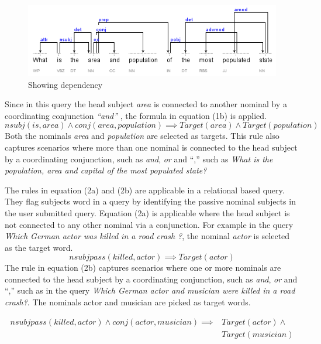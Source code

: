 \documentclass[review]{elsarticle}
\begin{document}
\begin{figure}[h]
	\centering
		\includegraphics[scale=0.7,angle=0]{example1.png}
	\caption{Showing dependency }
	\label{fig:example1}
	\end{figure}
Since in this query the head subject \textit{area}  is  connected to another nominal by a coordinating conjunction \textit{``and'' },  the formula in equation (1b) is applied. 
\begin{equation*}
nsubj(is,area)\land conj(area,population)\implies Target(area)\land Target(population)
\end{equation*}
Both the nominals \textit{area} and \textit{population} are  selected as targets. This rule also captures scenarios where more than one nominal is connected to the head subject by a coordinating conjunction, such as \textit{and}, \textit{or} and ``,'' such as  \textit{What is the population, area and capital of the most populated state?}

The rules in equation (2a) and (2b) are  applicable in a relational based query. They  flag subjects word in a query by identifying the passive nominal subjects in the user submitted query. Equation (2a) is applicable where the head subject is not connected to any other nominal via a conjunction.  For example in the query \textit{ Which German actor was killed in a road crash ?}, the nominal \textit{actor} is selected as the target word.
\begin{equation*}
nsubjpass(killed,actor)\implies Target(actor)
\end{equation*}
  The rule in equation (2b)  captures scenarios where one or more  nominals  are connected to the head subject by a coordinating conjunction, such as \textit{and}, \textit{or} and ``,'' such as in the query \textit{Which German actor and musician were killed in a road crash?}. The nominals actor and musician are picked as target words.
 
\begin{equation*}
\begin{split}
nsubjpass(killed,actor)\land conj(actor,musician)\implies &Target(actor)\land \\&Target(musician)
\end{split}
\end{equation*}
\end{document}
